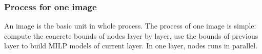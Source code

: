 %



\subsubsection*{Process for one image} An image is the basic unit in whole process. The process of one image is simple: compute the concrete bounds of nodes layer by layer, use the bounds of previous layer to build MILP models of current layer. In one layer, nodes runs in parallel.






%
%

